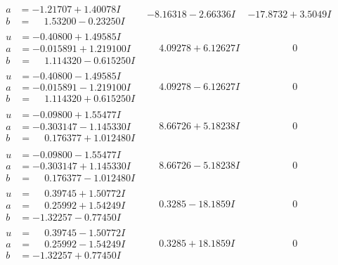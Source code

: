 \documentclass[1p]{elsarticle_modified}
\theoremstyle{definition}
\begin{document}
$$\begin{array}{c|c|c}
\begin{aligned}
a &= -1.21707 + 1.40078 I \\
b &= \phantom{-}1.53200 - 0.23250 I\end{aligned}
 & -8.16318 - 2.66336 I & -17.8732 + 3.5049 I \\ \hline\begin{aligned}
u &= -0.40800 + 1.49585 I \\
a &= -0.015891 + 1.219100 I \\
b &= \phantom{-}1.114320 - 0.615250 I\end{aligned}
 & \phantom{-}4.09278 + 6.12627 I & \phantom{-0.000000 } 0 \\ \hline\begin{aligned}
u &= -0.40800 - 1.49585 I \\
a &= -0.015891 - 1.219100 I \\
b &= \phantom{-}1.114320 + 0.615250 I\end{aligned}
 & \phantom{-}4.09278 - 6.12627 I & \phantom{-0.000000 } 0 \\ \hline\begin{aligned}
u &= -0.09800 + 1.55477 I \\
a &= -0.303147 - 1.145330 I \\
b &= \phantom{-}0.176377 + 1.012480 I\end{aligned}
 & \phantom{-}8.66726 + 5.18238 I & \phantom{-0.000000 } 0 \\ \hline\begin{aligned}
u &= -0.09800 - 1.55477 I \\
a &= -0.303147 + 1.145330 I \\
b &= \phantom{-}0.176377 - 1.012480 I\end{aligned}
 & \phantom{-}8.66726 - 5.18238 I & \phantom{-0.000000 } 0 \\ \hline\begin{aligned}
u &= \phantom{-}0.39745 + 1.50772 I \\
a &= \phantom{-}0.25992 + 1.54249 I \\
b &= -1.32257 - 0.77450 I\end{aligned}
 & \phantom{-}0.3285 - 18.1859 I & \phantom{-0.000000 } 0 \\ \hline\begin{aligned}
u &= \phantom{-}0.39745 - 1.50772 I \\
a &= \phantom{-}0.25992 - 1.54249 I \\
b &= -1.32257 + 0.77450 I\end{aligned}
 & \phantom{-}0.3285 + 18.1859 I & \phantom{-0.000000 } 0 \\ \hline\begin{aligned}

\end{aligned}
\end{array}$$
\end{document}

